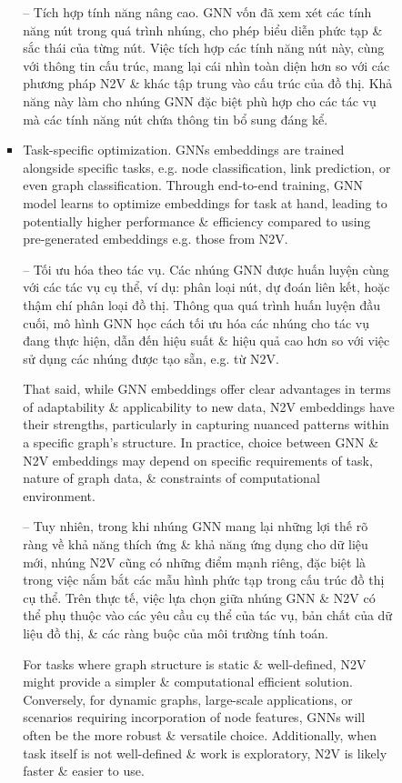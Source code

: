 \documentclass{article}
\begin{document}
\begin{itemize}
\begin{itemize}
\begin{itemize}
\begin{itemize}
               -- {\sf Tích hợp tính năng nâng cao.} GNN vốn đã xem xét các tính năng nút trong quá trình nhúng, cho phép biểu diễn phức tạp \& sắc thái của từng nút. Việc tích hợp các tính năng nút này, cùng với thông tin cấu trúc, mang lại cái nhìn toàn diện hơn so với các phương pháp N2V \& khác tập trung vào cấu trúc của đồ thị. Khả năng này làm cho nhúng GNN đặc biệt phù hợp cho các tác vụ mà các tính năng nút chứa thông tin bổ sung đáng kể.
               \item {\sf Task-specific optimization.} GNNs embeddings are trained alongside specific tasks, e.g. node classification, link prediction, or even graph classification. Through end-to-end training, GNN model learns to optimize embeddings for task at hand, leading to potentially higher performance \& efficiency compared to using pre-generated embeddings e.g. those from N2V.

               -- {\sf Tối ưu hóa theo tác vụ.} Các nhúng GNN được huấn luyện cùng với các tác vụ cụ thể, ví dụ: phân loại nút, dự đoán liên kết, hoặc thậm chí phân loại đồ thị. Thông qua quá trình huấn luyện đầu cuối, mô hình GNN học cách tối ưu hóa các nhúng cho tác vụ đang thực hiện, dẫn đến hiệu suất \& hiệu quả cao hơn so với việc sử dụng các nhúng được tạo sẵn, e.g. từ N2V.

               That said, while GNN embeddings offer clear advantages in terms of adaptability \& applicability to new data, N2V embeddings have their strengths, particularly in capturing nuanced patterns within a specific graph's structure. In practice, choice between GNN \& N2V embeddings may depend on specific requirements of task, nature of graph data, \& constraints of computational environment.

               -- Tuy nhiên, trong khi nhúng GNN mang lại những lợi thế rõ ràng về khả năng thích ứng \& khả năng ứng dụng cho dữ liệu mới, nhúng N2V cũng có những điểm mạnh riêng, đặc biệt là trong việc nắm bắt các mẫu hình phức tạp trong cấu trúc đồ thị cụ thể. Trên thực tế, việc lựa chọn giữa nhúng GNN \& N2V có thể phụ thuộc vào các yêu cầu cụ thể của tác vụ, bản chất của dữ liệu đồ thị, \& các ràng buộc của môi trường tính toán.

               For tasks where graph structure is static \& well-defined, N2V might provide a simpler \& computational efficient solution. Conversely, for dynamic graphs, large-scale applications, or scenarios requiring incorporation of node features, GNNs will often be the more robust \& versatile choice. Additionally, when task itself is not well-defined \& work is exploratory, N2V is likely faster \& easier to use.


\end{itemize}
\end{itemize}
\end{itemize}
\end{itemize}
\end{document}
